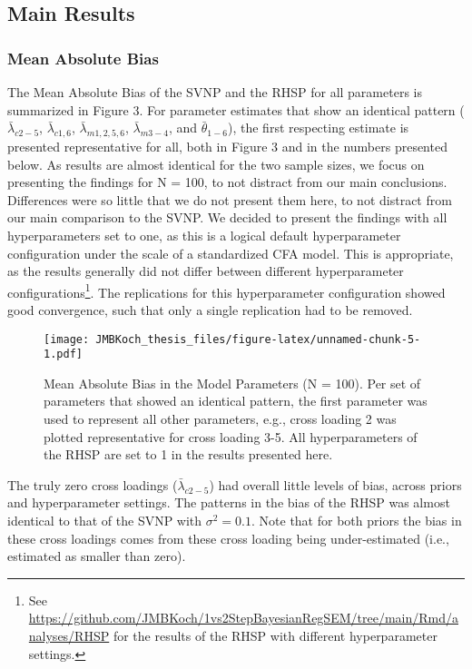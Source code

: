 \documentclass[
  man, donotrepeattitle,floatsintext]{apa6}
\begin{document}
\hypertarget{main-results}{%
\subsection{Main Results}\label{main-results}}

\hypertarget{mean-absolute-bias-1}{%
\subsubsection{Mean Absolute Bias}\label{mean-absolute-bias-1}}

The Mean Absolute Bias of the SVNP and the RHSP for all parameters is
summarized in Figure 3. For parameter estimates that show an identical
pattern (\(\bar{\lambda}_{c 2-5}\), \(\bar{\lambda}_{c 1, 6}\),
\(\bar{\lambda}_{m 1, 2, 5, 6}\), \(\bar{\lambda}_{m 3-4}\), and
\(\bar{\theta}_{1-6}\)), the first respecting estimate is presented
representative for all, both in Figure 3 and in the numbers presented
below. As results are almost identical for the two sample sizes, we
focus on presenting the findings for N = 100, to not distract from our
main conclusions. Differences were so little that we do not present them
here, to not distract from our main comparison to the SVNP. We decided
to present the findings with all hyperparameters set to one, as this is
a logical default hyperparameter configuration under the scale of a
standardized CFA model. This is appropriate, as the results generally
did not differ between different hyperparameter configurations\footnote{See \url{https://github.com/JMBKoch/1vs2StepBayesianRegSEM/tree/main/Rmd/analyses/RHSP} for the results of the RHSP with different hyperparameter settings.}. The
replications for this hyperparameter configuration showed good
convergence, such that only a single replication had to be removed.

\begin{figure}
\centering
\texttt{[image: JMBKoch\_thesis\_files/figure-latex/unnamed-chunk-5-1.pdf]}
\caption{\label{fig:unnamed-chunk-5}Mean Absolute Bias in the Model Parameters (N = 100). Per set of parameters that showed an identical pattern, the first parameter was used to represent all other parameters, e.g., cross loading 2 was plotted representative for cross loading 3-5. All hyperparameters of the RHSP are set to 1 in the results presented here.}
\end{figure}

The truly zero cross loadings (\(\bar{\lambda}_{c 2-5}\)) had overall
little levels of bias, across priors and hyperparameter settings. The
patterns in the bias of the RHSP was almost identical to that of the
SVNP with \(\sigma^2 = 0.1\). Note that for both priors the bias in these
cross loadings comes from these cross loading being under-estimated
(i.e., estimated as smaller than zero).
\end{document}
